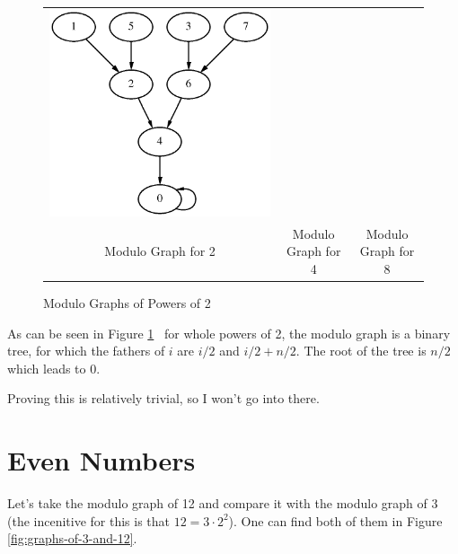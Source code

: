 \documentclass[a4paper]{report}
\begin{document}
\begin{figure}[ht]
\begin{tabular}{ccc}
\includegraphics[scale=0.75]{graph-8.eps} \\
Modulo Graph for 2 &
Modulo Graph for 4 &
Modulo Graph for 8

\end{tabular}
\caption{Modulo Graphs of Powers of 2}
\label{fig:graphs-of-powers-of-2}
\end{figure}

As can be seen in Figure \ref{fig:graphs-of-powers-of-2} ~for whole powers 
of 2,  the modulo graph is a binary tree, for which the fathers of $ i $ are 
$ i/2 $ and $ i/2 + n/2 $. The root of the tree is $ n/2 $ which leads to 0.

Proving this is relatively trivial, so I won't go into there.

\section{Even Numbers}

Let's take the modulo graph of 12 and compare it with the modulo graph of
3 (the incenitive for this is that $ 12 = 3 \cdot 2^{2} $). One can find
both of them in Figure \ref{fig:graphs-of-3-and-12}.
\end{document}
